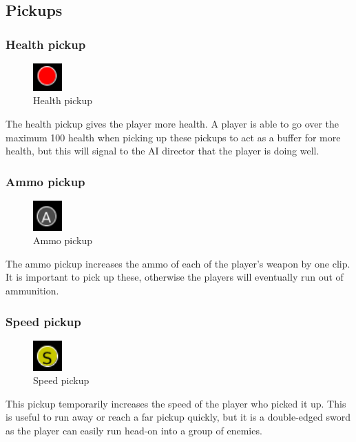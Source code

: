 \documentclass{article}
\begin{document}
\subsection{Pickups}
\subsubsection{Health pickup}
\begin{figure}[H]
\centering
\includegraphics[width=0.1\textwidth, keepaspectratio]{imgs/HealthPickup.png}
\caption{Health pickup}
\end{figure}
\noindent
The health pickup gives the player more health. A player is able to go over the maximum 100 health when picking up these pickups to act as a buffer for more health, but this will signal to the AI director that the player is doing well.
\subsubsection{Ammo pickup}
\begin{figure}[H]
\centering
\includegraphics[width=0.1\textwidth, keepaspectratio]{imgs/AmmoPickup.png}
\caption{Ammo pickup}
\end{figure}
\noindent
The ammo pickup increases the ammo of each of the player's weapon by one clip. It is important to pick up these, otherwise the players will eventually run out of ammunition.
\subsubsection{Speed pickup}
\begin{figure}[H]
\centering
\includegraphics[width=0.1\textwidth, keepaspectratio]{imgs/SpeedPickup.png}
\caption{Speed pickup}
\end{figure}
\noindent
This pickup temporarily increases the speed of the player who picked it up. This is useful to run away or reach a far pickup quickly, but it is a double-edged sword as the player can easily run head-on into a group of enemies.
\end{document}
